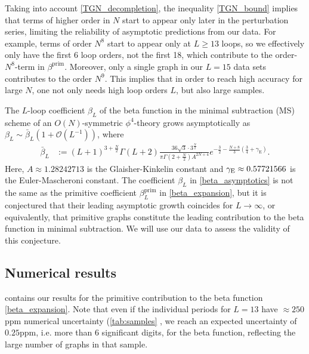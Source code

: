 \documentclass[12pt,a4paper]{article}
\renewcommand{\|}{\rule[-0.4ex]{0.2ex}{1.2em}}
\begin{document}
Taking into account \cref{TGN_decompletion}, the inequality \cref{TGN_bound} implies that terms of higher order in $N$ start to appear only later in the perturbation series, limiting the reliability of asymptotic predictions from our data. 
For example, terms of order $N^8$ start to appear only at $L\geq 13$ loops, so we effectively only have the first 6 loop orders, not the first 18, which contribute to the order-$N^8$-term in $\beta^\text{prim}$. Moreover, only a single graph in our $L=15$ data sets contributes to the order $N^9$. This implies that in order to reach high accuracy for large $N$, one not only needs high loop orders $L$, but also large samples.



The $L$-loop coefficient $\beta_L$ of the beta function in the minimal subtraction (MS) scheme of an $O(N)$-symmetric $\phi^4$-theory grows asymptotically as $\beta_L \sim \bar \beta_L \left( 1+ \mathcal{O}\left( L^{-1} \right)   \right)  $, where \cite{mckane_nonperturbative_1984,mckane_perturbation_2019}
\begin{align}\label{beta_asymptotics}
	 \bar \beta_L &:=(L+1)^{3+\frac{N}{2}}\Gamma(L+2) \frac{36 \sqrt 3\cdot 3^{ \frac{N}{2}}  }{\pi   \Gamma \left( 2+\frac{N}{2} \right) A^{2N+4} } e^{-\frac 32 - \frac{N+8}{3}\left( \frac 3 4 + \gamma_\text{E} \right)   }    .
\end{align}
Here, $A\approx 1.28242713$ is the Glaisher-Kinkelin constant \cite{kinkelin_ueber_1860} and $\gamma_\text E\approx 0.57721566$ is the Euler-Mascheroni constant. 
The  coefficient $\beta_L$ in \cref{beta_asymptotics} is not the same as the primitive coefficient $\beta^\text{prim}_L$ in \cref{beta_expansion}, but it is conjectured \cite{mckane_perturbation_2019} that their leading asymptotic growth coincides for $L\rightarrow\infty$, or equivalently, that primitive graphs constitute the leading contribution to the beta function in minimal subtraction. We will use our data to assess the validity of this conjecture.



 

\subsection{Numerical results}\label{sec:beta_numerical}



 contains our results for the primitive contribution to the beta function \cref{beta_expansion}. Note that even if the individual periods  for $L=13$ have $\approx 250$ppm numerical uncertainty (\cref{tab:samples} ,  we reach an expected uncertainty of $0.25$ppm, i.e. more than 6 significant digits, for the beta function, reflecting the large number of graphs in that sample.
\end{document}
